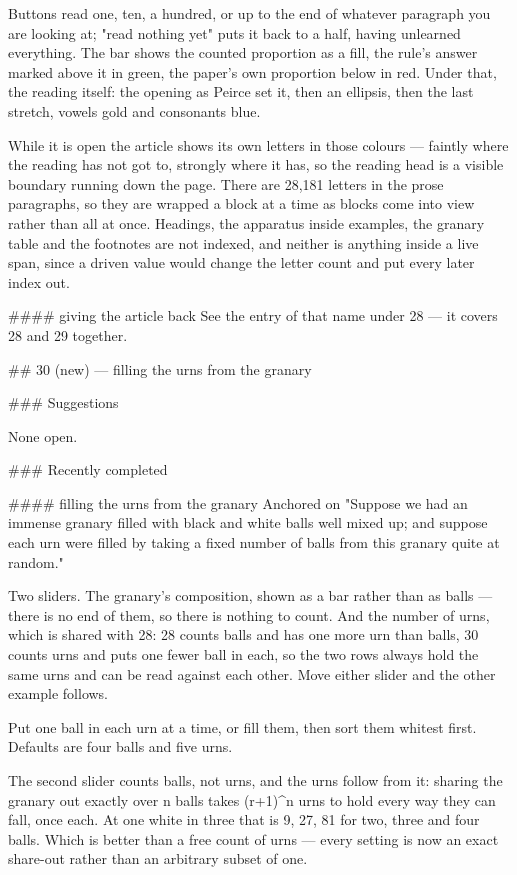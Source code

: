 Buttons read one, ten, a hundred, or up to the end of whatever paragraph you are
looking at; "read nothing yet" puts it back to a half, having unlearned
everything. The bar shows the counted proportion as a fill, the rule's answer
marked above it in green, the paper's own proportion below in red. Under that,
the reading itself: the opening as Peirce set it, then an ellipsis, then the
last stretch, vowels gold and consonants blue.

While it is open the article shows its own letters in those colours — faintly
where the reading has not got to, strongly where it has, so the reading head is
a visible boundary running down the page. There are 28,181 letters in the prose
paragraphs, so they are wrapped a block at a time as blocks come into view
rather than all at once. Headings, the apparatus inside examples, the granary
table and the footnotes are not indexed, and neither is anything inside a live
span, since a driven value would change the letter count and put every later
index out.

#### giving the article back
See the entry of that name under 28 — it covers 28 and 29 together.


## 30 (new) — filling the urns from the granary

### Suggestions

None open.

### Recently completed

#### filling the urns from the granary
Anchored on "Suppose we had an immense granary filled with black and white balls
well mixed up; and suppose each urn were filled by taking a fixed number of
balls from this granary quite at random."

Two sliders. The granary's composition, shown as a bar rather than as balls —
there is no end of them, so there is nothing to count. And the number of urns,
which is shared with 28: 28 counts balls and has one more urn than balls, 30
counts urns and puts one fewer ball in each, so the two rows always hold the
same urns and can be read against each other. Move either slider and the other
example follows.

Put one ball in each urn at a time, or fill them, then sort them whitest first.
Defaults are four balls and five urns.

The second slider counts balls, not urns, and the urns follow from it: sharing
the granary out exactly over n balls takes (r+1)^n urns to hold every way they
can fall, once each. At one white in three that is 9, 27, 81 for two, three and
four balls. Which is better than a free count of urns — every setting is now an
exact share-out rather than an arbitrary subset of one.

